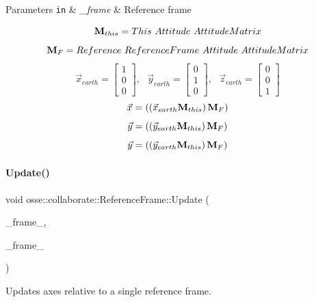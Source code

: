 \begin{DoxyParams}[1]{Parameters}
\mbox{\tt in}  & {\em \+\_\+frame} & Reference frame\\
\hline
\end{DoxyParams}
\[ {\bf{M}}_{this} = This~Attitude~AttitudeMatrix \] \[ {\bf{M}}_{F} = Reference~ReferenceFrame~Attitude~AttitudeMatrix \] \[ \vec{x}_{earth} = \begin{bmatrix} 1 \\ 0 \\ 0 \end{bmatrix},~~~ \vec{y}_{earth} = \begin{bmatrix} 0 \\ 1 \\ 0 \end{bmatrix},~~~ \vec{z}_{earth} = \begin{bmatrix} 0 \\ 0 \\ 1 \end{bmatrix} \] \[ \vec{x} = \left(\left(\vec{x}_{earth}{\bf{M}}_{this}\right){\bf{M}}_{F}\right) \] \[ \vec{y} = \left(\left(\vec{y}_{earth}{\bf{M}}_{this}\right){\bf{M}}_{F}\right) \] \[ \vec{y} = \left(\left(\vec{y}_{earth}{\bf{M}}_{this}\right){\bf{M}}_{F}\right) \] \mbox{\label{classosse_1_1collaborate_1_1_reference_frame_aa32123d1bb0af3ba1f3bb68d72c8e6e3}} 
\paragraph{\texorpdfstring{Update()}{Update()}\hspace{0.1cm}{\footnotesize\ttfamily [2/2]}}
{\footnotesize\ttfamily void osse\+::collaborate\+::\+Reference\+Frame\+::\+Update (\begin{DoxyParamCaption}\item[{const \hyperlink{classosse_1_1collaborate_1_1_reference_frame}{Reference\+Frame} \&}]{\+\_\+frame\+\_,  }\item[{const \hyperlink{classosse_1_1collaborate_1_1_reference_frame}{Reference\+Frame} \&}]{\+\_\+frame\+\_ }\end{DoxyParamCaption})}



Updates axes relative to a single reference frame. 


